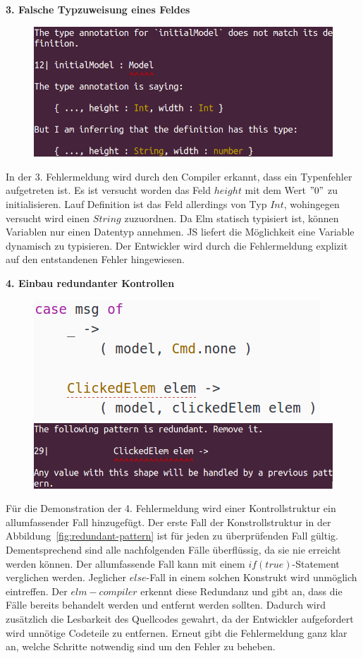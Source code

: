\textbf{3. Falsche Typzuweisung eines Feldes}\\
\begin{figure}[h!]
\centering
\includegraphics[scale=0.5]{img/types-error.png}
\end{figure}
In der 3. Fehlermeldung wird durch den Compiler erkannt, dass ein Typenfehler aufgetreten ist. Es ist versucht worden das Feld $height$ mit dem Wert $"0"$ zu initialisieren. Lauf Definition ist das Feld allerdings von Typ $Int$, wohingegen versucht wird einen $String$ zuzuordnen. Da Elm statisch typisiert ist, können Variablen nur einen Datentyp annehmen. \ac{JS} liefert die Möglichkeit eine Variable dynamisch zu typisieren. Der Entwickler wird durch die Fehlermeldung explizit auf den entstandenen Fehler hingewiesen.

\textbf{4. Einbau redundanter Kontrollen}\\
\begin{figure}[h!]
\centering
\includegraphics[scale=0.5]{img/redundant-pattern-code.png}
\includegraphics[scale=0.5]{img/redundant-pattern-error.png}
\end{figure}
Für die Demonstration der 4. Fehlermeldung wird einer Kontrollstruktur ein allumfassender Fall hinzugefügt. Der erste Fall der Konstrollstruktur in der Abbildung~\ref{fig:redundant-pattern} ist für jeden zu überprüfenden Fall gültig. Dementsprechend sind alle nachfolgenden Fälle überflüssig, da sie nie erreicht werden können. Der allumfassende Fall kann mit einem $if(true)$-Statement verglichen werden. Jeglicher $else$-Fall in einem solchen Konstrukt wird unmöglich eintreffen. Der $elm-compiler$ erkennt diese Redundanz und gibt an, dass die Fälle bereits behandelt werden und entfernt werden sollten. Dadurch wird zusätzlich die Lesbarkeit des Quellcodes gewahrt, da der Entwickler aufgefordert wird unnötige Codeteile zu entfernen. Erneut gibt die Fehlermeldung ganz klar an, welche Schritte notwendig sind um den Fehler zu beheben.


